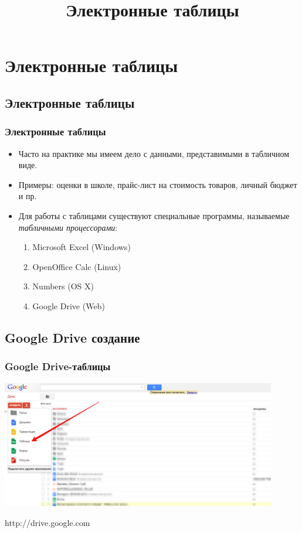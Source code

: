 \documentclass[compress,red]{beamer}
\title{Электронные таблицы}
\begin{document}
\maketitle

\section{Электронные таблицы}

\subsection{Электронные таблицы}
\begin{frame}[fragile]
  \frametitle{Электронные таблицы}
  \begin{itemize}
    \item Часто на практике мы имеем дело с данными, представимыми в табличном виде.
    \item Примеры: оценки в школе, прайс-лист на стоимость товаров, личный бюджет и пр.
    \item Для работы с таблицами существуют специальные программы, называемые \emph{табличными процессорами}:
      \begin{enumerate}
          \item Microsoft Excel (Windows)
          \item OpenOffice Calc (Linux)
          \item Numbers (OS X)
          \item Google Drive (Web)
      \end{enumerate}
  \end{itemize}
\end{frame}

\subsection{Google Drive создание}
\begin{frame}[fragile]
  \frametitle{Google Drive-таблицы}
  \centerline{\includegraphics[width=0.9\textwidth]{images/01.png}}
  \centerline{\Large{http://drive.google.com}}
\end{frame}
\end{document}
